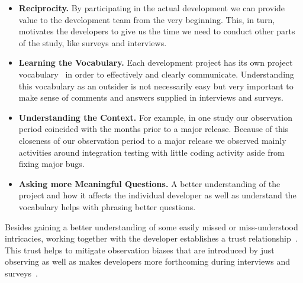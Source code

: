 \begin{itemize}
\item\textbf{Reciprocity.} By participating in the actual development we can provide value to the development team from the very beginning.
This, in turn, motivates the developers to give us the time we need to conduct other parts of the study, like surveys and interviews.
\item\textbf{Learning the Vocabulary.} Each development project has its own project vocabulary~\cite{espinosa2007:team_knowledge} in order to effectively and clearly communicate. 
Understanding this vocabulary as an outsider is not necessarily easy but very important to make sense of comments and answers supplied in interviews and surveys.
\item\textbf{Understanding the Context.} For example, in one study our observation period coincided with the months prior to a major release. 
Because of this closeness of our observation period to a major release we observed mainly activities around integration testing with little coding activity aside from fixing major bugs.


\item\textbf{Asking more Meaningful Questions.} A better understanding of the project and how it affects the individual developer as well as understand the vocabulary helps with phrasing better questions.
\end{itemize}

Besides gaining a better understanding of some easily missed or miss-understood intricacies, working together with the developer establishes a trust relationship~\cite{letherbridge:ese2005}.
This trust helps to mitigate observation biases that are introduced by just observing as well as makes developers more forthcoming during interviews and surveys~\cite{letherbridge:ese2005}.

